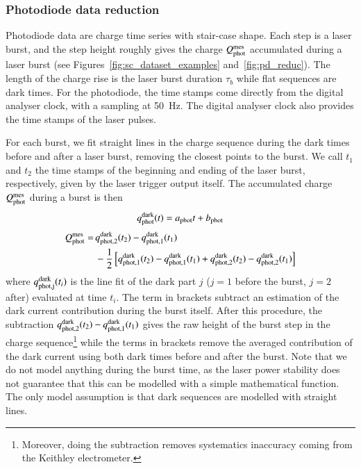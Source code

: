 \subsubsection{Photodiode data reduction}
\label{sec:pd_reduction}

Photodiode data are charge time series with stair-case shape. Each step is a laser burst, and the step height roughly gives the charge $Q_{\mathrm{phot}}^{\mathrm{mes}}$ accumulated during a laser burst (see Figures~\ref{fig:sc_dataset_examples} and~\ref{fig:pd_reduc}). The length of the charge rise is the laser burst duration $\tau_b$ while flat sequences are dark times. For the photodiode, the time stamps come directly from the digital analyser clock, with a sampling at \SI{50}{\hertz}. The digital analyser clock also provides the time stamps of the laser pulses. 

For each burst, we fit straight lines in the charge sequence during the dark times before and after a laser burst, removing the closest points to the burst. We call $t_1$ and $t_2$ the time stamps of the beginning and ending of the laser burst, respectively, given by the laser trigger output itself. 
The accumulated charge $Q_{\mathrm{phot}}^{\mathrm{mes}}$ during a burst is then
\begin{equation}
q_{\rm phot}^{\rm dark}(t) = a_{\rm phot} t + b_{\rm phot}
\end{equation}
\begin{align}
Q_{\mathrm{phot}}^{\mathrm{mes}} = \, &q_{\rm phot,2}^{\rm dark}(t_2) - q_{\rm phot,1}^{\rm dark}(t_1)\\ & - \frac{1}{2} \left[ q_{\rm phot,1}^{\rm dark}(t_2) -  q_{\rm phot,1}^{\rm dark}(t_1) + q_{\rm phot,2}^{\rm dark}(t_2) - q_{\rm phot,2}^{\rm dark}(t_1)  \right]   \notag 
\end{align}
where $q_{\rm phot,j}^{\rm dark}(t_i)$ is the line fit of the dark part $j$ ($j=1$ before the burst, $j=2$ after) evaluated at time $t_i$. The term in brackets subtract an estimation of the dark current contribution during the burst itself. After this procedure, the subtraction $q_{\rm phot,2}^{\rm dark}(t_2) - q_{\rm phot,1}^{\rm dark}(t_1)$ gives the raw height of the burst step in the charge sequence\footnote{Moreover, doing the subtraction removes systematics inaccuracy coming from the Keithley electrometer.} while the terms in brackets remove the averaged contribution of the dark current using both dark times before and after the burst. Note that we do not model anything during the burst time, as the laser power stability does not guarantee that this can be modelled with a simple mathematical function. The only model assumption is that dark sequences are modelled with straight lines.

